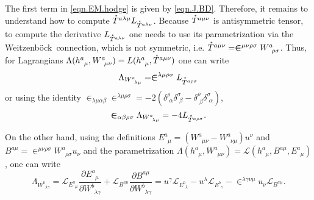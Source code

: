 \documentclass[
10pt, %
a4paper, %
oneside, %
headinclude,footinclude, %
BCOR5mm, %
]{scrartcl}
\newcommand{\tetrsymbol}{h}
\newcommand{\tetr}[2]{\tetrsymbol^{#1}_{\phantom{#1}#2}}
\newcommand{\ET}[2]{E^{#1}_{\phantom{#1}#2}}	%
\newcommand{\BT}[2]{B^{#1#2}}	%
\newcommand{\w}[2]{W^{#1}_{\phantom{#1}#2}}
\newcommand{\We}{Weitzenb\"ock}
\newcommand{\Lag}{\Lambda}	%
\newcommand{\Laghodge}{L}%
\newcommand{\LagBE}{\mathcal{L}}%
\newcommand{\LCsymb}{\bm{\in}}    %
\newcommand{\HDT}[1]{\accentset{\star}{T}^{#1}}
\newcommand{\KD}[2]{\delta^{#1}_{\,\,#2}}
\begin{document}
The first term in \eqref{eqn.EM.hodge} is given by \eqref{eqn.J.BD}. Therefore, it remains to 
understand how to compute $ \HDT{a\lambda\mu}L_{\HDT{a\lambda\nu}} $. Because $ \HDT{a\mu\nu} $ is 
antisymmetric tensor, to compute the derivative $ \Laghodge_{\HDT{a\lambda\nu}} $ one needs to use 
its parametrization via the \We\ connection, which is not symmetric, i.e. $ \HDT{a\mu\nu} = 
\LCsymb^{\mu\nu\rho\sigma} \w{a}{\rho\sigma}$. Thus, for Lagrangians $ 
\Lag(\tetr{a}{\mu},\w{a}{\mu\nu}) = 
\Laghodge(\tetr{a}{\mu},\HDT{a\mu\nu})$ one can write 
\begin{equation}
	\Lag_{\w{a}{\lambda\mu}} = \LCsymb^{\lambda\mu\rho\sigma} \Laghodge_{\HDT{a\rho\sigma}}
\end{equation}
or using the identity $ \LCsymb_{\lambda\mu\alpha\beta}\LCsymb^{\lambda\mu\rho\sigma} = 
-2(\KD{\rho}{\alpha}\KD{\sigma}{\beta} - \KD{\rho}{\beta}\KD{\sigma}{\alpha}) $, 
\begin{equation}\label{eqn.L.T}
	\LCsymb_{\alpha\beta\rho\sigma}\Lag_{\w{a}{\lambda\mu}} = -4 \Laghodge_{\HDT{a\rho\sigma}}.
\end{equation}

On the other hand, using the definitions $ \ET{a}{\mu} = (\w{a}{\mu\nu} - \w{a}{\nu\mu})u^\nu $ and $ 
\BT{a}{\mu} = \LCsymb^{\mu\nu\rho\sigma}\w{a}{\rho\sigma} u_\nu $ and  the parametrization $ 
\Lag(\tetr{a}{\mu},\w{a}{\mu\nu}) = \LagBE(\tetr{a}{\mu},\BT{a}{\mu},\ET{a}{\mu}) $, one can write
\begin{equation}\label{eqn.Lambda.W}
	\Lag_{\w{b}{\lambda\gamma}} = 
	\LagBE_{\ET{a}{\mu}} \frac{\partial \ET{a}{\mu}}{\partial \w{b}{\lambda\gamma}} 
	+
	\LagBE_{\BT{a}{\mu}} \frac{\partial \BT{a}{\mu}}{\partial \w{b}{\lambda\gamma}} 
	=
	u^\gamma \LagBE_{\ET{b}{\lambda}} - u^\lambda \LagBE_{\ET{b}{\gamma}} - 
	\LCsymb^{\lambda\gamma\nu\mu} u_\nu \LagBE_{\BT{a}{\mu}}.
\end{equation}
\end{document}
